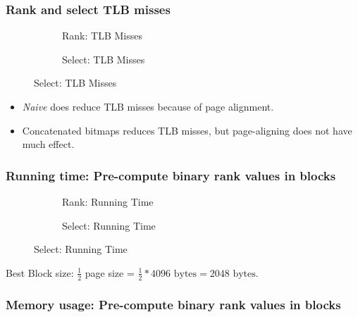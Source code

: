 \documentclass{beamer}
\begin{document}

\begin{frame}
\frametitle{Rank and select TLB misses}
\begin{figure}\tiny
\begin{subfigure}{0.48\textwidth}
	\scalebox{.7}{}
	\caption{Rank: TLB Misses}
\end{subfigure}
\hfill
\begin{subfigure}{0.48\textwidth}
	\scalebox{.7}{}
	\caption{Select: TLB Misses}
\end{subfigure}
\end{figure}
\begin{itemize}
\item \textit{Naive} does reduce TLB misses because of page alignment.
\item Concatenated bitmaps reduces TLB misses, but page-aligning does not have much effect.
\end{itemize}
\end{frame}
\begin{frame}
\frametitle{Running time: Pre-compute binary rank values in blocks}
\begin{figure}
\begin{subfigure}{0.45\textwidth}
	\begin{tiny}	
	\scalebox{.7}{}
	\end{tiny}
	\caption{Rank: Running Time}
\end{subfigure}
\hfill
\begin{subfigure}{0.45\textwidth}
	\begin{tiny}	
	\scalebox{.7}{}
	\end{tiny}
	\caption{Select: Running Time}
\end{subfigure}
\end{figure}
Best Block size: $\frac{1}{2}$ page size = $\frac{1}{2}*4096 \text{ bytes} = 2048 \text{ bytes}$.
\end{frame}


\begin{frame}
\frametitle{Memory usage: Pre-compute binary rank values in blocks}
\begin{center}
\begin{tiny}

\end{tiny}
\end{center}
\end{frame}
\end{document}
